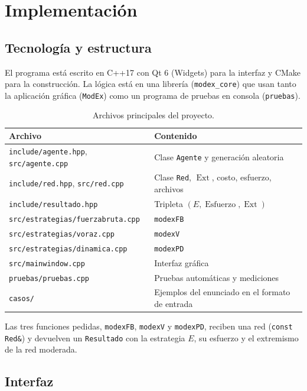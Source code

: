 \documentclass[11pt,letterpaper]{article}
\newcommand{\Ext}{\operatorname{Ext}}
\newcommand{\Esf}{\operatorname{Esfuerzo}}
\begin{document}
\section{Implementación}

\subsection{Tecnología y estructura}

El programa está escrito en C++17 con Qt 6 (Widgets) para la interfaz y
CMake para la construcción. La lógica está en una librería
(\texttt{modex\_core}) que usan tanto la aplicación gráfica (\texttt{ModEx})
como un programa de pruebas en consola (\texttt{pruebas}).

\begin{table}[h]
\centering
\small
\begin{tabular}{ll}
\toprule
Archivo & Contenido \\
\midrule
\texttt{include/agente.hpp}, \texttt{src/agente.cpp} & Clase \texttt{Agente} y generación aleatoria \\
\texttt{include/red.hpp}, \texttt{src/red.cpp} & Clase \texttt{Red}, $\Ext$, costo, esfuerzo, archivos \\
\texttt{include/resultado.hpp} & Tripleta $(E, \Esf, \Ext)$ \\
\texttt{src/estrategias/fuerzabruta.cpp} & \texttt{modexFB} \\
\texttt{src/estrategias/voraz.cpp} & \texttt{modexV} \\
\texttt{src/estrategias/dinamica.cpp} & \texttt{modexPD} \\
\texttt{src/mainwindow.cpp} & Interfaz gráfica \\
\texttt{pruebas/pruebas.cpp} & Pruebas automáticas y mediciones \\
\texttt{casos/} & Ejemplos del enunciado en el formato de entrada \\
\bottomrule
\end{tabular}
\caption{Archivos principales del proyecto.}
\end{table}

Las tres funciones pedidas, \texttt{modexFB}, \texttt{modexV} y
\texttt{modexPD}, reciben una red (\texttt{const Red\&}) y devuelven un
\texttt{Resultado} con la estrategia $E$, su esfuerzo y el extremismo de la
red moderada.

\subsection{Interfaz}
\end{document}
